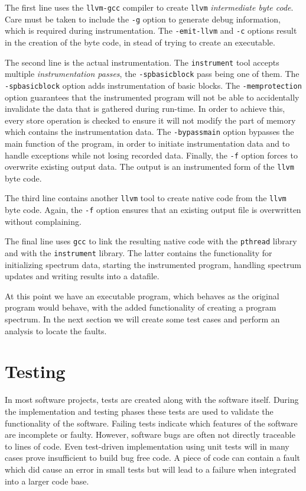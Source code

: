 	The first line uses the \verb|llvm-gcc| compiler to create \verb|llvm| \emph{intermediate byte code}.
	Care must be taken to include the \verb|-g| option to generate debug information,
	which is required during instrumentation.
	The \verb|-emit-llvm| and \verb|-c| options result in the creation of the byte code, 
	in stead of trying to create an executable.
	
	The second line is the actual instrumentation.
	The \verb|instrument| tool accepts multiple \emph{instrumentation passes},
	the \verb|-spbasicblock| pass being one of them.
	The \verb|-spbasicblock| option adds instrumentation of basic blocks.
	The \verb|-memprotection| option guarantees that the instrumented program
	will not be able to accidentally invalidate the data that is gathered during run-time.
	In order to achieve this, every store operation is checked to ensure it will not
	modify the part of memory which contains the instrumentation data.
	The \verb|-bypassmain| option bypasses the main function of the program,
	in order to initiate instrumentation data and to handle exceptions while
	not losing recorded data.
	Finally, the \verb|-f| option forces to overwrite existing output data.
	The output is an instrumented form of the \verb|llvm| byte code.
	
	The third line contains another \verb|llvm| tool to create native code from the 
	\verb|llvm| byte code.
	Again, the \verb|-f| option ensures that an existing output file is overwritten
	without complaining.
	
	The final line uses \verb|gcc| to link the resulting native code with 
	the \verb|pthread| library and with the \verb|instrument| library.
	The latter contains the functionality for initializing spectrum data,
	starting the instrumented program, handling spectrum updates and
	writing results into a datafile.
	
	At this point we have an executable program,
	which behaves as the original program would behave,
	with the added functionality of creating a program spectrum.
	In the next section we will create some test cases and 
	perform an analysis to locate the faults.
	

\section{Testing}

	In most software projects, tests are created along with the software itself.
	During the implementation and testing phases these tests are used to validate
	the functionality of the software.
	Failing tests indicate which features of the software are incomplete or faulty.
	However, software bugs are often not directly traceable to lines of code.
	Even test-driven implementation using unit tests will in many cases prove insufficient 
	to build bug free code.
	A piece of code can contain a fault which did cause an error in small tests
	but will lead to a failure when integrated into a larger code base.
	
